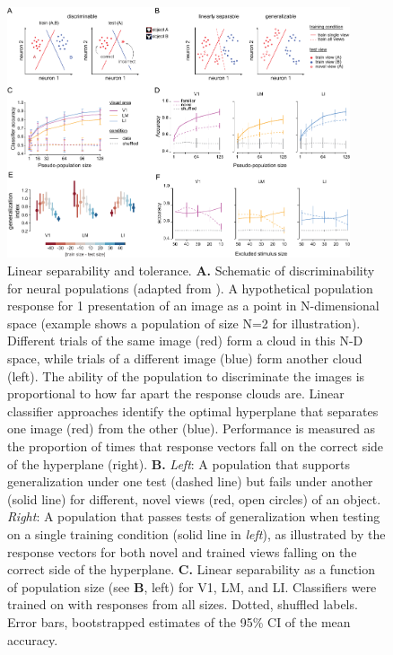 \begin{figure}[t!]
    \includegraphics[width=0.9\textwidth]{figures/chapter_4/fig_4-4_neural_generalization/fig_4-4_neural_generalization.pdf}
    \centering
    \caption[Population representations of objects]{Linear separability and tolerance. 
    \textbf{A.} Schematic of discriminability for neural populations (adapted from \citet{Rust2010SelectivityIT}). A hypothetical population response for 1 presentation of an image as a point in N-dimensional space (example shows a population of size N=2 for illustration). Different trials of the same image (red) form a cloud in this N-D space, while trials of a different image (blue) form another cloud (left). The ability of the population to discriminate the images is proportional to how far apart the response clouds are. Linear classifier approaches identify the optimal hyperplane that separates one image (red) from the other (blue). Performance is measured as the proportion of times that response vectors fall on the correct side of the hyperplane (right). 
    \textbf{B.} \textit{Left}: A population that supports generalization under one test (dashed line) but fails under another (solid line) for different, novel views (red, open circles) of an object. \textit{Right}: A population that passes tests of generalization when testing on a single training condition (solid line in \textit{left}), as illustrated by the response vectors for both novel and trained views falling on the correct side of the hyperplane.
    \textbf{C.} Linear separability as a function of population size (see \textbf{B}, left) for V1, LM, and LI. Classifiers were trained on with responses from all sizes. Dotted, shuffled labels. Error bars, bootstrapped estimates of the 95\% CI of the mean accuracy. 
}
\end{figure}
